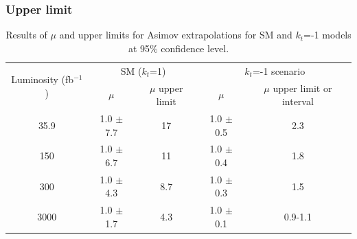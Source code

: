 \documentclass[11pt]{beamer}
\begin{document}
 \begin{frame}
 \frametitle{Upper limit}
 \begin{table}[ht]
 {  \tiny
 		\caption[Results of $\mu$ and upper limits for SM and $k_t$=-1]{Results of $\mu$ and upper limits for Asimov extrapolations for SM  and $k_t$=-1 models at 95$\%$ confidence level.}
 		\begin{tabular}{|c|c|c|c|c|}
 			\hline
 			\multirow{2}{*}{Luminosity (fb$^{-1}$)}  &\multicolumn{2}{c|}{SM ($k_t$=1)} &\multicolumn{2}{c|}{$k_t$=-1 scenario}\\
 			\hhline{~----}                        &$\mu$  &$\mu$ upper limit & $\mu$ &$\mu$ upper limit or interval\\
 			\hline
 			35.9 & 1.0 $\pm$ 7.7 & 17 & 1.0 $\pm$ 0.5 & 2.3 \\
 			\hline
 			150& 1.0 $\pm$ 6.7& 11 & 1.0 $\pm$ 0.4 &1.8\\
 			\hline
 			300&1.0 $\pm$ 4.3 &8.7 & 1.0 $\pm$ 0.3 &1.5 \\
 			\hline
 			3000&1.0 $\pm$ 1.7 & 4.3 & 1.0 $\pm$ 0.1 & 0.9-1.1\\
 			\hline
 		\end{tabular}
 		\label{upper}
                }
 	\end{table}
 \end{frame}



\end{document}
